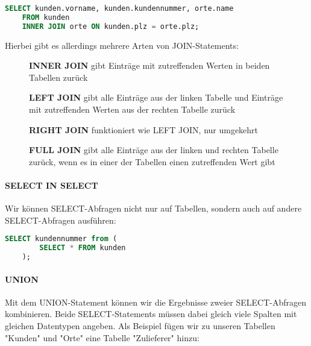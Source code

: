 \documentclass{article}
\begin{document}
	\begin{lstlisting}[language=SQL, caption=Wir erhalten Vornamen sowie Kundennummern und dazugehörige Ortsnamen]
	SELECT kunden.vorname, kunden.kundennummer, orte.name
	FROM kunden
	INNER JOIN orte ON kunden.plz = orte.plz;
	\end{lstlisting}

	Hierbei gibt es allerdings mehrere Arten von JOIN-Statements:

	\begin{figure}[h!]
		\centering
		
		\caption{\textbf{INNER JOIN} gibt Einträge mit zutreffenden Werten in beiden Tabellen zurück}
	\end{figure}

	\begin{figure}[h!]
		\centering
		
		\caption{\textbf{LEFT JOIN} gibt alle Einträge aus der linken Tabelle und Einträge mit zutreffenden Werten aus der rechten Tabelle zurück}
	\end{figure}

	\begin{figure}[h!]
		\centering
		
		\caption{\textbf{RIGHT JOIN} funktioniert wie LEFT JOIN, nur umgekehrt}
	\end{figure}

	\begin{figure}[h!]
		\centering
		
		\caption{\textbf{FULL JOIN} gibt alle Einträge aus der linken und rechten Tabelle zurück, wenn es in einer der Tabellen einen zutreffenden Wert gibt}
	\end{figure}

	\paragraph{SELECT IN SELECT}
	Wir können SELECT-Abfragen nicht nur auf Tabellen, sondern auch auf andere SELECT-Abfragen ausführen:

	\begin{lstlisting}[language=SQL]
	SELECT kundennummer from (
		SELECT * FROM kunden
	);
	\end{lstlisting}

	\paragraph{UNION}
	Mit dem UNION-Statement können wir die Ergebnisse zweier SELECT-Abfragen kombinieren. Beide SELECT-Statements müssen dabei gleich viele Spalten mit gleichen Datentypen angeben.
	Als Beispiel fügen wir zu unseren Tabellen "Kunden" und "Orte" eine Tabelle "Zulieferer" hinzu:
\end{document}
